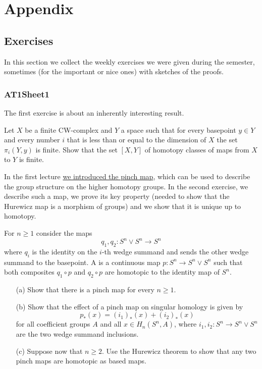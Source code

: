 
\chapter{Appendix}

\section{Exercises}

In this section we collect the weekly exercises we were given during the semester, sometimes (for the important or nice ones) with sketches of the proofs.

\subsection{AT1Sheet1}

The first exercise is about an inherently interesting result.

\label{exercise:AT1Sheet1.1}
Let $X$ be a finite CW-complex and $Y$ a space such that for every basepoint $y\in Y$ and every number $i$ that is less than or equal to the dimension of $X$ the set $\pi_i(Y,y)$ is finite. Show that the set $[X,Y]$ of homotopy classes of maps from $X$ to $Y$ is finite.

\begin{sketch}
\end{sketch}

In the first lecture \hyperref[paragraph:hurewicz-morphism]{we introduced the pinch map}, which can be used to describe the group structure on the higher homotopy groups. In the second exercise, we describe such a map, we prove its key property (needed to show that the Hurewicz map is a morphism of groups) and we show that it is unique up to homotopy.

\label{exercise:AT1Sheet1.2}
For $n \ge 1$ consider the maps
\[q_1, q_2 : S^n\vee S^n\to S^n\]
where $q_i$ is the identity on the $i$-th wedge summand and sends the other wedge summand to the basepoint. A  is a continuous map $p : S^n\to S^n\vee S^n$ such that both
composites $q_1 \circ p$ and $q_2 \circ p$ are homotopic to the identity map of $S^n$.
\begin{enumerate}
    \item[(a)] Show that there is a pinch map for every $n\ge 1$.
    \item[(b)] Show that the effect of a pinch map on singular homology is given by
    \[ p_*(x) = (i_1)_*(x) + (i_2)_*(x)\]
    for all coefficient groups $A$ and all $x\in H_n(S^n,A)$, where $i_1, i_2 : S^n \to S^n\vee S^n$ are the two wedge summand inclusions.
    \item[(c)] Suppose now that $n\ge 2$. Use the Hurewicz theorem to show that any two pinch maps are homotopic as based maps.
\end{enumerate}

